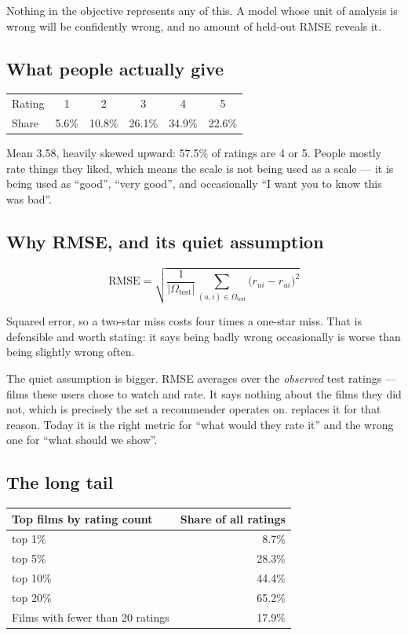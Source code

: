 \documentclass[11pt,a4paper]{article}
\begin{document}
Nothing in the objective represents any of this. A model whose unit of analysis
is wrong will be confidently wrong, and no amount of held-out RMSE reveals it.

\subsection{What people actually give}

\begin{center}
\small
\begin{tabular}{lccccc}
\toprule
Rating & 1 & 2 & 3 & 4 & 5 \\
Share  & 5.6\% & 10.8\% & 26.1\% & 34.9\% & 22.6\% \\
\bottomrule
\end{tabular}
\end{center}

Mean 3.58, heavily skewed upward: 57.5\% of ratings are 4 or 5. People mostly
rate things they liked, which means the scale is not being used as a scale ---
it is being used as ``good'', ``very good'', and occasionally ``I want you to
know this was bad''.

\subsection{Why RMSE, and its quiet assumption}

\[
  \text{RMSE} = \sqrt{\frac{1}{|\Omega_{\text{test}}|}
  \sum_{(u,i)\in\Omega_{\text{test}}} \big(r_{ui} - \hat r_{ui}\big)^2}
\]

Squared error, so a two-star miss costs four times a one-star miss. That is
defensible and worth stating: it says being badly wrong occasionally is worse
than being slightly wrong often.

The quiet assumption is bigger. RMSE averages over the \emph{observed} test
ratings --- films these users chose to watch and rate. It says nothing about
the films they did not, which is precisely the set a recommender operates on.
 replaces it for that reason. Today it is the right metric for
``what would they rate it'' and the wrong one for ``what should we show''.

\subsection{The long tail}

\begin{center}
\small
\begin{tabular}{lr}
\toprule
\textbf{Top films by rating count} & \textbf{Share of all ratings} \\
\midrule
top 1\%  & 8.7\% \\
top 5\%  & 28.3\% \\
top 10\% & 44.4\% \\
top 20\% & 65.2\% \\
\midrule
Films with fewer than 20 ratings & 17.9\% \\
\bottomrule
\end{tabular}
\end{center}
\end{document}
